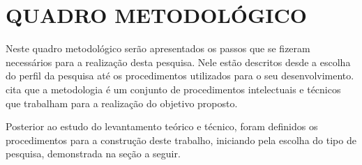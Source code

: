 
\chapter{QUADRO METODOLÓGICO}
\label{cap:quadroMetodologico}


\par Neste quadro metodológico serão apresentados os passos que se fizeram necessários para a realização desta pesquisa. Nele estão descritos desde a escolha do perfil da pesquisa até os procedimentos utilizados para o seu desenvolvimento.  cita que a metodologia é um conjunto de procedimentos intelectuais e técnicos que trabalham para a realização do objetivo proposto.
\par Posterior ao estudo do levantamento teórico e técnico, foram definidos os procedimentos para a construção deste trabalho, iniciando pela escolha do tipo de pesquisa, demonstrada na seção a seguir.







%



%

%



%

%